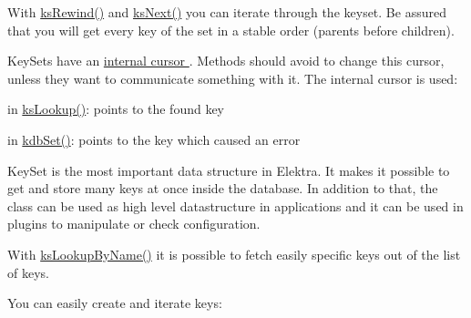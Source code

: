 With \hyperlink{group__keyset_gabe793ff51f1728e3429c84a8a9086b70}{ks\-Rewind()} and \hyperlink{group__keyset_ga317321c9065b5a4b3e33fe1c399bcec9}{ks\-Next()} you can iterate through the keyset. Be assured that you will get every key of the set in a stable order (parents before children).

Key\-Sets have an \hyperlink{group__keyset_ga4287b9416912c5f2ab9c195cb74fb094}{internal cursor }. Methods should avoid to change this cursor, unless they want to communicate something with it. The internal cursor is used\-:


\begin{DoxyItemize}
\item in \hyperlink{group__keyset_gaa34fc43a081e6b01e4120daa6c112004}{ks\-Lookup()}\-: points to the found key
\item in \hyperlink{group__kdb_ga11436b058408f83d303ca5e996832bcf}{kdb\-Set()}\-: points to the key which caused an error
\end{DoxyItemize}

Key\-Set is the most important data structure in Elektra. It makes it possible to get and store many keys at once inside the database. In addition to that, the class can be used as high level datastructure in applications and it can be used in plugins to manipulate or check configuration.

With \hyperlink{group__keyset_gad2e30fb6d4739d917c5abb2ac2f9c1a1}{ks\-Lookup\-By\-Name()} it is possible to fetch easily specific keys out of the list of keys.

You can easily create and iterate keys\-: 
 

